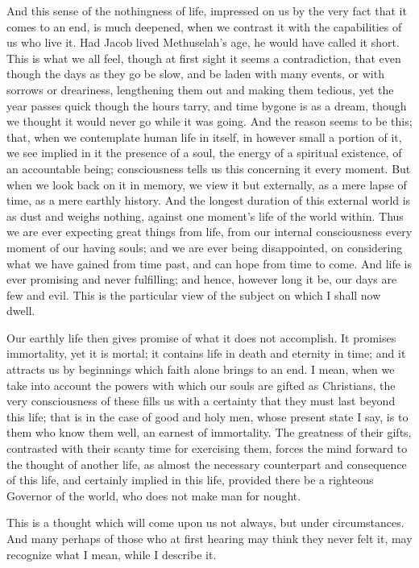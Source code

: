 And this sense of the nothingness of life, impressed on us by the
very fact that it comes to an end, is much deepened, when we contrast
it with the capabilities of us who live it. Had Jacob lived Methuselah's
age, he would have called it short. This is what we all feel, though
at first sight it seems a contradiction, that even though the days as
they go be slow, and be laden with many events, or with sorrows or
dreariness, lengthening them out and making them tedious, yet the year
passes quick though the hours tarry, and time bygone is as a dream,
though we thought it would never go while it was going. And the reason
seems to be this; that, when we contemplate human life in itself, in
however small a portion of it, we see implied in it the presence of a
soul, the energy of a spiritual existence, of an accountable being;
consciousness tells us this concerning it every moment. But when we
look back on it in memory, we view it but externally, as a mere lapse
of time, as a mere earthly history. And the longest duration of this
external world is as dust and weighs nothing, against one moment's
life of the world within. Thus we are ever expecting great things from
life, from our internal consciousness every moment of our having
souls; and we are ever being disappointed, on considering what we have
gained from time past, and can hope from time to come. And life is
ever promising and never fulfilling; and hence, however long it be,
our days are few and evil. This is the particular view of the subject
on which I shall now dwell.

Our earthly life then gives promise of what it does not accomplish.
It promises immortality, yet it is mortal; it contains life in death
and eternity in time; and it attracts us by beginnings which faith
alone brings to an end. I mean, when we take into account the powers
with which our souls are gifted as Christians, the very consciousness
of these fills us with a certainty that they must last beyond this
life; that is in the case of good and holy men, whose present state I
say, is to them who know them well, an earnest of immortality. The
greatness of their gifts, contrasted with their scanty time for
exercising them, forces the mind forward to the thought of another
life, as almost the necessary counterpart and consequence of this
life, and certainly implied in this life, provided there be a
righteous Governor of the world, who does not make man for nought.

This is a thought which will come upon us not always, but under
circumstances. And many perhaps of those who at first hearing may
think they never felt it, may recognize what I mean, while I
describe it.

